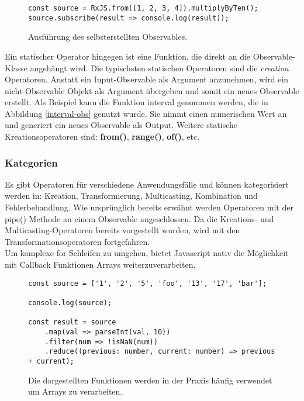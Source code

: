 \begin{figure}[H]
\begin{lstlisting}[basicstyle=\small]
const source = RxJS.from([1, 2, 3, 4]).multiplyByTen();
source.subscribe(result => console.log(result));
\end{lstlisting}
\caption{Ausführung des selbsterstellten Observables.}
\end{figure}

\noindent
Ein statischer Operator hingegen ist eine Funktion, die direkt an die Observable-Klasse angehängt wird. Die typischsten statischen Operatoren sind die \textit{creation} Operatoren. Anstatt ein Input-Observable als Argument anzunehmen, wird ein nicht-Observable Objekt als Argument übergeben und somit ein neues Observable erstellt. Als Beispiel kann die Funktion interval genommen werden, die in Abbildung \ref{interval-obs} genutzt wurde. Sie nimmt einen numerischen Wert an und generiert ein neues Observable als Output. Weitere statische Kreationsoperatoren sind: \textbf{from()}, \textbf{range()}, \textbf{of()}, etc.

\subsubsection{Kategorien}

Es gibt Operatoren für verschiedene Anwendungsfälle und können kategorisiert werden in: Kreation, Transformierung, Multicasting, Kombination und Fehlerbehandlung. Wie ursprünglich bereits erwähnt werden Operatoren mit der pipe() Methode an einem Observable angeschlossen. Da die Kreations- und Multicasting-Operatoren bereits vorgestellt wurden, wird mit den Transformationsoperatoren fortgefahren.\\

\noindent
Um komplexe for Schleifen zu umgehen, bietet Javascript nativ die Möglichkeit mit Callback Funktionen Arrays weiterzuverarbeiten.

\begin{figure}[H]
\begin{lstlisting}[basicstyle=\small]
const source = ['1', '2', '5', 'foo', '13', '17', 'bar'];

console.log(source);

const result = source
    .map(val => parseInt(val, 10))
    .filter(num => !isNaN(num))
    .reduce((previous: number, current: number) => previous + current);
\end{lstlisting}
\caption{Die dargestellten Funktionen werden in der Praxis häufig verwendet um Arrays zu verarbeiten.}
\end{figure}

